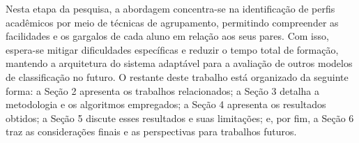 Nesta etapa da pesquisa, a abordagem concentra-se na identificação de perfis acadêmicos por meio de técnicas de agrupamento, permitindo compreender as facilidades e os gargalos de cada aluno em relação aos seus pares. Com isso, espera-se mitigar dificuldades específicas e reduzir o tempo total de formação, mantendo a arquitetura do sistema adaptável para a avaliação de outros modelos de classificação no futuro. O restante deste trabalho está organizado da seguinte forma: a Seção 2 apresenta os trabalhos relacionados; a Seção 3 detalha a metodologia e os algoritmos empregados; a Seção 4 apresenta os resultados obtidos; a Seção 5 discute esses resultados e suas limitações; e, por fim, a Seção 6 traz as considerações finais e as perspectivas para trabalhos futuros.

